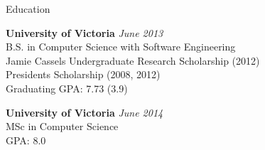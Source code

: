 \documentclass{resume} %
\begin{document}

\begin{rSection}{Education}

{\bf University of Victoria} \hfill {\em June 2013} \\ 
B.S. in Computer Science with Software Engineering \\
Jamie Cassels Undergraduate Research Scholarship (2012) \\
Presidents Scholarship (2008, 2012) \\
Graduating GPA: 7.73 (3.9)

{\bf University of Victoria} \hfill {\em June 2014} \\ 
MSc in Computer Science\\
GPA: 8.0

\end{rSection}

\end{document}
